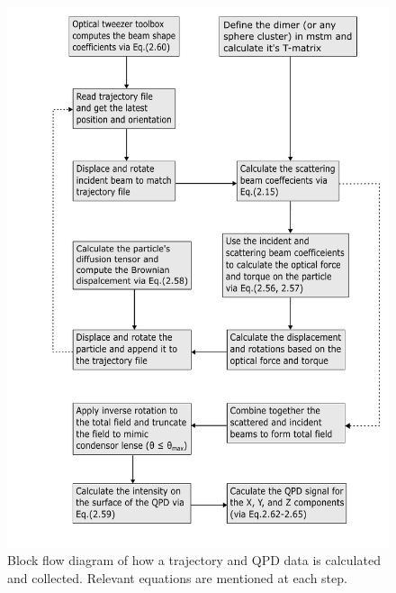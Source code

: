 \begin{figure}
	\centering
	\includegraphics[width=0.75\linewidth]{Simulation_workflow.pdf}
	\caption{Block flow diagram of how a trajectory and QPD data is 
		calculated and collected. Relevant equations are mentioned 
		at each step.}
\end{figure}
\newpage


